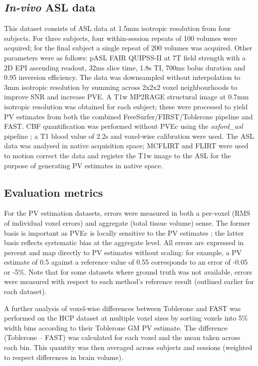\subsection{\textit{In-vivo} ASL data} 
This dataset consists of ASL data at 1.5mm isotropic resolution from four subjects. For three subjects, four within-session repeats of 100 volumes were acquired; for the final subject a single repeat of 200 volumes was acquired. Other parameters were as follows: pASL FAIR QUIPSS-II at 7T field strength with a 2D EPI ascending readout, 32ms slice time, 1.8s TI, 700ms bolus duration and 0.95 inversion efficiency. The data was downsampled without interpolation to 3mm isotropic resolution by summing across 2x2x2 voxel neighbourhoods to improve SNR and increase PVE. A T1w MP2RAGE structural image at 0.7mm isotropic resolution was obtained for each subject; these were processed to yield PV estimates from both the combined FreeSurfer/FIRST/Toblerone pipeline and FAST. CBF quantification was performed without PVEc using the \textit{oxford\_asl} pipeline \cite{Chappell2009, oxford-asl}; a T1 blood value of 2.2s \cite{Zhang2013} and voxel-wise calibration were used. The ASL data was analysed in native acquisition space; MCFLIRT and FLIRT \cite{flirt} were used to motion correct the data and register the T1w image to the ASL for the purpose of generating PV estimates in native space. 

\subsection{Evaluation metrics}

For the PV estimation datasets, errors were measured in both a per-voxel (RMS of individual voxel errors) and aggregate (total tissue volume) sense. The former basis is important as PVEc is locally sensitive to the PV estimates \cite{Zhao2017a}; the latter basis reflects systematic bias at the aggregate level. All errors are expressed in percent and map directly to PV estimates without scaling: for example, a PV estimate of 0.5 against a reference value of 0.55 corresponds to an error of -0.05 or -5\%. Note that for some datasets where ground truth was not available, errors were measured with respect to each method's reference result (outlined earlier for each dataset). 

A further analysis of voxel-wise differences between Toblerone and FAST was performed on the HCP dataset at multiple voxel sizes by sorting voxels into 5\% width bins according to their Toblerone GM PV estimate. The difference (Toblerone – FAST) was calculated for each voxel and the mean taken across each bin. This quantity was then averaged across subjects and sessions (weighted to respect differences in brain volume).

